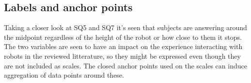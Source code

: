 \subsection{Labels and anchor points}
Taking a closer look at SQ5 and SQ7 it's seen that subjects are answering around the midpoint regardless of the height of the robot or how close to them it stops. The two variables are seen to have an impact on the experience interacting with robots in the reviewed litterature, so they might be expressed even though they are not included as scales. The closed anchor points used on the scales can induce aggregation of data points around these. 